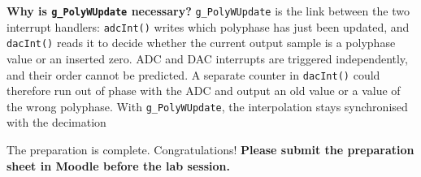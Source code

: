 \documentclass[a4paper,11pt]{article}
\begin{document}
\medskip
\noindent\textbf{Why is \texttt{g\_PolyWUpdate} necessary?} \texttt{g\_PolyWUpdate} is the link between the two interrupt handlers: \texttt{adcInt()} writes which polyphase has just been updated, and \texttt{dacInt()} reads it to decide whether the current output sample is a polyphase value or an inserted zero. ADC and DAC interrupts are triggered independently, and their order cannot be predicted. A separate counter in \texttt{dacInt()} could therefore run out of phase with the ADC and output an old value or a value of the wrong polyphase. With \texttt{g\_PolyWUpdate}, the interpolation stays synchronised with the decimation
	
	\bigskip
	\noindent The preparation is complete. Congratulations!
	\textbf{Please submit the preparation sheet in Moodle before the lab session.}
	
\end{document}
